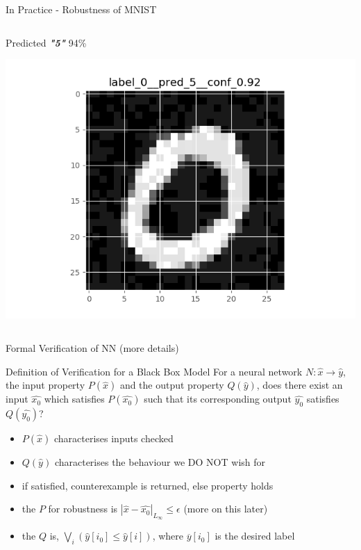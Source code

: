 \documentclass[t,compress,aspectratio=169]{beamer}
\begin{document}
\begin{frame}{In Practice - Robustness of MNIST}
\begin{columns}
\begin{column}{0.32\textwidth}
            \begin{center}
                        Predicted \textit{\textbf{"5"}} 94\%

             \includegraphics[width=\textwidth]{img/adv.png}
             \end{center}
        \end{column}
    \end{columns}


\end{frame}

\begin{frame}[fragile]{Formal Verification of NN (more details)}
	\vspace{-1em}
	\begin{alertblock}{Definition of Verification for a Black Box Model}
		For a neural network $N : \hat{x} \rightarrow \hat{y}$, the input property $P(\hat{x})$ and the output property $Q(\hat{y})$, does there exist an input $\hat{x_0}$ which satisfies $P(\hat{x_0})$ such that its corresponding output $\hat{y_0}$ satisfies $Q(\hat{y_0})$?
	\end{alertblock}
		\vspace{1em}
	\begin{itemize}
		
		\item $P(\hat{x})$ characterises inputs checked
		\item $Q(\hat{y})$ characterises the behaviour we \textcolor{aisecred}{DO NOT} wish for
		\item if satisfied, counterexample is returned, else property holds
		\item the $P$ for robustness is $|\hat{x} - \hat{x_0}|_{ L_{\infty}} \leq \epsilon$ (more on this later)
		\item the $Q$ is, $\bigvee_i(\hat{y}[i_0] \leq \hat{y}[i])$, where $\overline{y}[i_0]$ is the desired label
	\end{itemize}
\end{frame}
\end{document}
